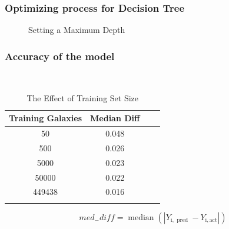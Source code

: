 \documentclass{beamer}
\begin{document}
\begin{frame}
	\frametitle{Optimizing process for Decision Tree}
    \begin{figure}
        \caption*{Setting a Maximum Depth}
    \end{figure}
    \end{frame}
\begin{frame}
	\frametitle{Accuracy of the model}
    \begin{table}[ht]\
        \caption*{The Effect of Training Set Size} %
        \centering %
        \begin{tabular}{c c c c} %
        \hline\hline %
        Training Galaxies & Median Diff \\ [0.5ex] %
        \hline %
        50 & 0.048  \\ %
        500 & 0.026  \\
        5000 & 0.023  \\
        50000 & 0.022  \\ [1ex] %
        449438 & 0.016 \\[1ex]
        \hline %
        \\
        \end{tabular}
        \label{table:nonlin} %
        \end{table}
        \begin{equation}
            m e d_{-} d i f f=\operatorname{median}\left(\left|Y_{\mathrm{i}, \text { pred }}-Y_{\mathrm{i}, \mathrm{act}}\right|\right)
            \end{equation}
    \end{frame}
\end{document}
